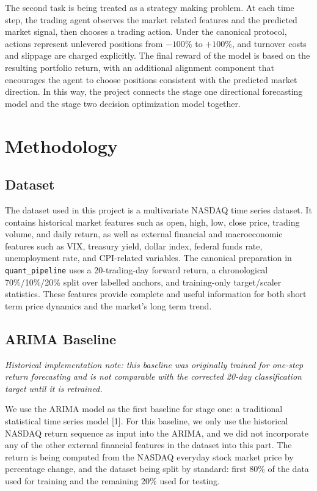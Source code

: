 \documentclass{article}
\begin{document}
The second task is being treated as a strategy making problem. At each time step, the trading agent observes the market related features and the predicted market signal, then chooses a trading action. Under the canonical protocol, actions represent unlevered positions from $-100\%$ to $+100\%$, and turnover costs and slippage are charged explicitly. The final reward of the model is based on the resulting portfolio return, with an additional alignment component that encourages the agent to choose positions consistent with the predicted market direction. In this way, the project connects the stage one directional forecasting model and the stage two decision optimization model together.

\section{Methodology}

\subsection{Dataset}
The dataset used in this project is a multivariate NASDAQ time series dataset. It contains historical market features such as open, high, low, close price, trading volume, and daily return, as well as external financial and macroeconomic features  such as VIX, treasury yield, dollar index, federal funds rate, unemployment rate, and CPI-related variables. The canonical preparation in \texttt{quant\_pipeline} uses a 20-trading-day forward return, a chronological 70\%/10\%/20\% split over labelled anchors, and training-only target/scaler statistics. These features provide complete and useful information for both short term price dynamics and the market's long term trend.

\subsection{ARIMA Baseline}

\textit{Historical implementation note: this baseline was originally trained for one-step return forecasting and is not comparable with the corrected 20-day classification target until it is retrained.}

We use the ARIMA model as the first baseline for stage one: a traditional statistical time series model [1]. For this baseline, we only use the historical NASDAQ return sequence as input into the ARIMA, and we did not incorporate any of the other external financial features in the dataset into this part. The return is being computed from the NASDAQ everyday stock market price by percentage change, and the dataset being split by standard: first 80\% of the data used for training and the remaining 20\% used for testing.
\end{document}
